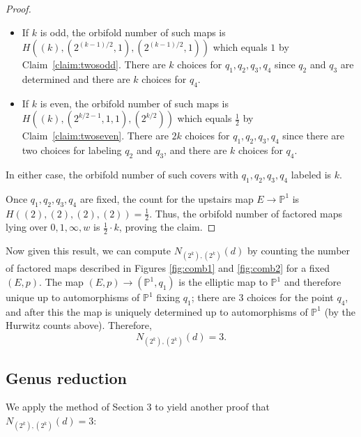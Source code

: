 \documentclass[thesis]{thesis-umich}           %
\renewcommand{\P}{\mathbb P}
\theoremstyle{definition}
\begin{document}
\begin{proof}
  \begin{itemize}
  \item If $k$ is odd, the orbifold number of such maps is $H((k),(2^{(k-1)/2},1),(2^{(k-1)/2},1))$ which
    equals $1$ by Claim~\ref{claim:twosodd}. There are $k$ choices for $q_1,q_2,q_3,q_4$
    since $q_2$ and $q_3$ are determined and there are $k$ choices for $q_4$.
  \item If $k$ is even, the orbifold number of such maps is $H((k),(2^{k/2-1},1,1),(2^{k/2}))$ which equals $\frac 12$ by Claim~\ref{claim:twoseven}. There are $2k$ choices for $q_1,q_2,q_3,q_4$
    since there are two choices for labeling $q_2$ and $q_3$, and there are $k$ choices for
    $q_4$.
  \end{itemize}
  In either case, the orbifold number of such covers with $q_1,q_2,q_3,q_4$ labeled is $k$.

  Once $q_1,q_2,q_3,q_4$ are fixed, the count for the upstairs map $E\to\P^1$ is
  $H((2),(2),(2),(2))=\frac 12$. Thus, the orbifold number of factored maps lying over $0,1,\infty,w$ is $\frac 12\cdot k$, proving the claim.
  
\end{proof}

Now given this result, we can compute $N_{(2^k),(2^k)}(d)$ by counting
the number of factored maps described in Figures \ref{fig:comb1} and \ref{fig:comb2} for a fixed $(E,p)$.
The map $(E,p)\to(\P^1,q_1)$ is the elliptic map to $\P^1$ and therefore unique up
to automorphisms of $\P^1$ fixing $q_1$; there are $3$ choices for the point
$q_4$, and after this the map is uniquely determined up to automorphisms of
$\P^1$ (by the Hurwitz counts above). Therefore,
\[
N_{(2^k),(2^k)}(d)=3.
\]

\subsection{Genus reduction}

We apply the method of Section 3 to yield another proof that
$N_{(2^k),(2^k)}(d)=3$:
\end{document}

